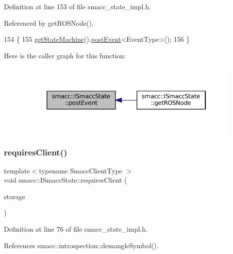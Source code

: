 Definition at line 153 of file smacc\+\_\+state\+\_\+impl.\+h.



Referenced by get\+R\+O\+S\+Node().


\begin{DoxyCode}
154 \{
155     \hyperlink{classsmacc_1_1ISmaccState_a562bb3f9a3ac16b8be71e4794c9e7523}{getStateMachine}().\hyperlink{classsmacc_1_1ISmaccStateMachine_afcb6a216441aeaea2cba4e1ab12c366b}{postEvent}<EventType>();
156 \}
\end{DoxyCode}
Here is the caller graph for this function\+:
\nopagebreak
\begin{figure}[H]
\begin{center}
\leavevmode
\includegraphics[width=346pt]{classsmacc_1_1ISmaccState_a1308e7a5348de1870c26b3b00a92cf55_icgraph}
\end{center}
\end{figure}
\mbox{\label{classsmacc_1_1ISmaccState_a7f95c9f0a6ea2d6f18d1aec0519de4ac}} 
\subsubsection{\texorpdfstring{requires\+Client()}{requiresClient()}}
{\footnotesize\ttfamily template$<$typename Smacc\+Client\+Type $>$ \\
void smacc\+::\+I\+Smacc\+State\+::requires\+Client (\begin{DoxyParamCaption}\item[{Smacc\+Client\+Type $\ast$\&}]{storage }\end{DoxyParamCaption})}



Definition at line 76 of file smacc\+\_\+state\+\_\+impl.\+h.



References smacc\+::introspection\+::demangle\+Symbol().



